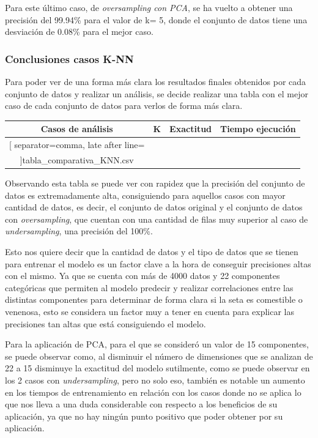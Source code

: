 \documentclass{Plantilla/Formato_EPEF}
\begin{document}
Para este último caso, de \textit{oversampling con PCA}, se ha vuelto a obtener una precisión del 99.94\% para el valor de k= 5, donde el conjunto de datos tiene una desviación de 0.08\%  para el mejor caso.

\subsubsection{Conclusiones casos K-NN}
Para poder ver de una forma más clara los resultados finales obtenidos por cada conjunto de datos y realizar un análisis, se decide realizar una tabla con el mejor caso de cada conjunto de datos para verlos de forma más clara.

\begin{longtable}{|c|c|c|c|}
	\hline
	\textbf{Casos de análisis} & \textbf{K} & \textbf{Exactitud} &  \textbf{Tiempo ejecución}\\ \hline
	\csvreader[
	separator=comma,
	late after line=\\ \hline
	]{tabla_comparativa_KNN.csv}{}%
	{\csvcoli & \csvcolii & \csvcoliii & \csvcoliv}
	\caption{Mejores casos de cada conjunto de datos}\\
\end{longtable}


Observando esta tabla se puede ver con rapidez que la precisión del conjunto de datos es extremadamente alta, consiguiendo para aquellos casos con mayor cantidad de datos, es decir, el conjunto de datos original y el conjunto de datos con \textit{oversampling}, que cuentan con una cantidad de filas muy superior al caso de \textit{undersampling}, una precisión del 100\%. 

Esto nos quiere decir que la cantidad de datos y el tipo de datos que se tienen para entrenar el modelo es un factor clave a la hora de conseguir precisiones altas con el mismo. Ya que se cuenta con más de 4000 datos y 22 componentes categóricas que permiten al modelo predecir y realizar correlaciones entre las distintas componentes para determinar de forma clara si la seta es comestible o venenosa, esto se considera un factor muy a tener en cuenta para explicar las precisiones tan altas que está consiguiendo el modelo.

Para la aplicación de PCA, para el que se consideró un valor de 15 componentes, se puede observar como, al disminuir el número de dimensiones que se analizan de 22 a 15 disminuye la exactitud del modelo sutilmente, como se puede observar en los 2 casos con \textit{undersampling}, pero no solo eso, también es notable un aumento en los tiempos de entrenamiento en relación con los casos donde no se aplica lo que nos lleva a una duda considerable con respecto a los beneficios de su aplicación, ya que no hay ningún punto positivo que poder obtener por su aplicación.
\end{document}
